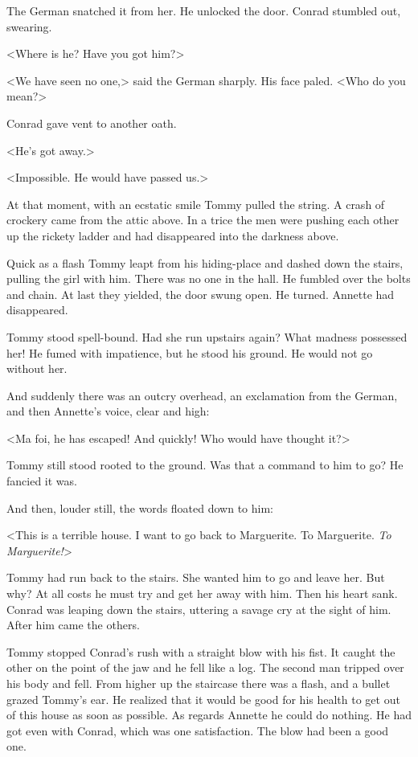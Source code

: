 The German snatched it from her. He unlocked the door. Conrad stumbled out, swearing.

<Where is he? Have you got him?>

<We have seen no one,> said the German sharply. His face paled. <Who do you mean?>

Conrad gave vent to another oath.

<He's got away.>

<Impossible. He would have passed us.>

At that moment, with an ecstatic smile Tommy pulled the string. A crash of crockery came from the attic above. In a trice the men were pushing each other up the rickety ladder and had disappeared into the darkness above.

Quick as a flash Tommy leapt from his hiding-place and dashed down the stairs, pulling the girl with him. There was no one in the hall. He fumbled over the bolts and chain. At last they yielded, the door swung open. He turned. Annette had disappeared.

Tommy stood spell-bound. Had she run upstairs again? What madness possessed her! He fumed with impatience, but he stood his ground. He would not go without her.

And suddenly there was an outcry overhead, an exclamation from the German, and then Annette's voice, clear and high:

<Ma foi, he has escaped! And quickly! Who would have thought it?>

Tommy still stood rooted to the ground. Was that a command to him to go? He fancied it was.

And then, louder still, the words floated down to him:

<This is a terrible house. I want to go back to Marguerite. To Marguerite. \emph{To Marguerite!}>

Tommy had run back to the stairs. She wanted him to go and leave her. But why? At all costs he must try and get her away with him. Then his heart sank. Conrad was leaping down the stairs, uttering a savage cry at the sight of him. After him came the others.

Tommy stopped Conrad's rush with a straight blow with his fist. It caught the other on the point of the jaw and he fell like a log. The second man tripped over his body and fell. From higher up the staircase there was a flash, and a bullet grazed Tommy's ear. He realized that it would be good for his health to get out of this house as soon as possible. As regards Annette he could do nothing. He had got even with Conrad, which was one satisfaction. The blow had been a good one.

